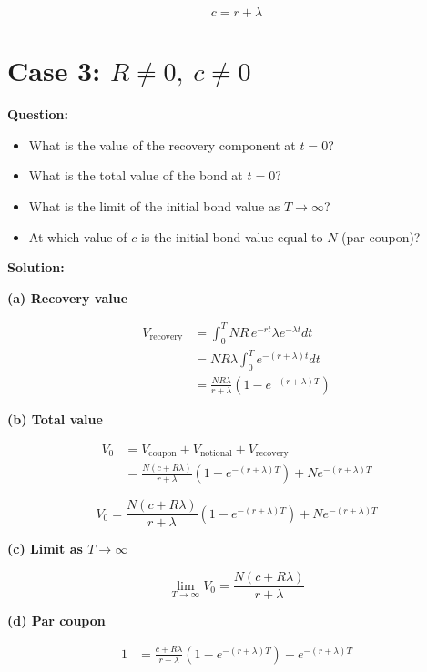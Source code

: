 \documentclass{article}
\begin{document}
\[
\boxed{c = r + \lambda}
\]


\section*{Case 3: $R \neq 0,\ c \neq 0$}

\textbf{Question:}
\begin{itemize}
    \item[(a)] What is the value of the recovery component at $t = 0$?
    \item[(b)] What is the total value of the bond at $t = 0$?
    \item[(c)] What is the limit of the initial bond value as $T \to \infty$?
    \item[(d)] At which value of $c$ is the initial bond value equal to $N$ (par coupon)?
\end{itemize}

\vspace{4pt}

\textbf{Solution:}

\textbf{(a) Recovery value}

\begin{align*}
V_{\text{recovery}}
&= \int_0^T NR \, e^{-rt} \lambda e^{-\lambda t} dt \\
&= NR \lambda \int_0^T e^{-(r+\lambda)t} dt \\
&= \frac{NR\lambda}{r+\lambda}\left(1 - e^{-(r+\lambda)T}\right)
\end{align*}

\textbf{(b) Total value}

\begin{align*}
V_0
&= V_{\text{coupon}} + V_{\text{notional}} + V_{\text{recovery}} \\
&= \frac{N(c + R\lambda)}{r+\lambda}\left(1 - e^{-(r+\lambda)T}\right)
+ N e^{-(r+\lambda)T}
\end{align*}

\[
\boxed{
V_0 =
\frac{N(c + R\lambda)}{r+\lambda}\left(1 - e^{-(r+\lambda)T}\right)
+ N e^{-(r+\lambda)T}
}
\]

\textbf{(c) Limit as $T \to \infty$}

\[
\boxed{
\lim_{T \to \infty} V_0 = \frac{N(c + R\lambda)}{r+\lambda}
}
\]

\textbf{(d) Par coupon}

\begin{align*}
1
&= \frac{c + R\lambda}{r+\lambda}\left(1 - e^{-(r+\lambda)T}\right)
+ e^{-(r+\lambda)T}
\end{align*}
\end{document}
